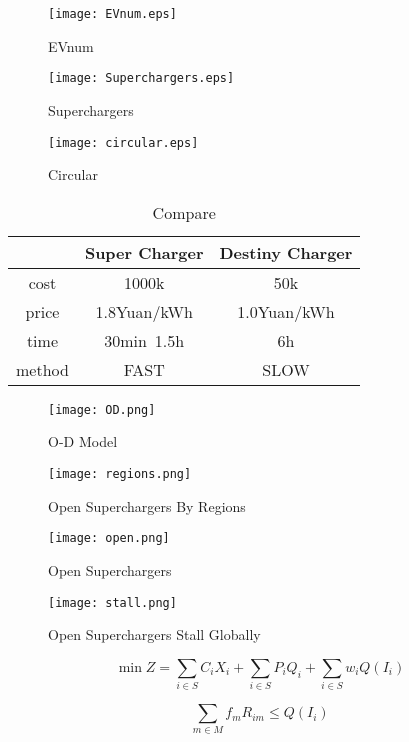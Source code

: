 \documentclass{mcmthesis}
\begin{document}
\begin{figure}[htbp]
\small
\centering
\texttt{[image: EVnum.eps]}
\caption{EVnum} 
\end{figure}

\begin{figure}[htbp]
\small
\centering
\texttt{[image: Superchargers.eps]}
\caption{Superchargers} 
\end{figure}


\begin{figure}[htbp]
\small
\centering
\texttt{[image: circular.eps]}
\caption{Circular} 
\end{figure}




\begin{table}[!htbp]
\centering
\begin{tabular}{|c|c|c|}
\hline
 &Super Charger&Destiny Charger \\
\hline
cost&1000k&50k\\
\hline
price& 1.8Yuan/kWh& 1.0Yuan/kWh\\
\hline
time& 30min~1.5h& 6h\\
\hline
method&FAST &SLOW \\
\hline
\end{tabular}
\caption{Compare}
\end{table}

\begin{figure}[htbp]
\small
\centering
\texttt{[image: OD.png]}
\caption{O-D Model} 
\end{figure}


\begin{figure}[htbp]
\small
\centering
\texttt{[image: regions.png]}
\caption{Open Superchargers By Regions} 
\end{figure}


\begin{figure}[htbp]
\small
\centering
\texttt{[image: open.png]}
\caption{Open Superchargers} 
\end{figure}


\begin{figure}[htbp]
\small
\centering
\texttt{[image: stall.png]}
\caption{Open Superchargers Stall Globally} 
\end{figure}

\[
\min Z=\sum _{i\in S}C_{i}X_{i} + \sum _{i\in S}P_{i}Q_{i} + \sum _{i\in S}w_{i}Q\left( I_{i}\right)
\]

\[	
\sum _{m\in M}f_{m}R_{im} \leq Q\left( I_{i}\right)
\]
\end{document}
